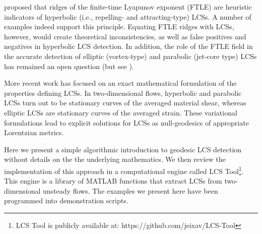 \documentclass{elsarticle}
\begin{document}
\citet{haller01:_distin} proposed that ridges of the finite-time Lyapunov exponent (FTLE) are heuristic indicators of hyperbolic (i.e., repelling- and attracting-type) LCSs. A number of examples indeed support this principle\citep{peacock13:_lagran}. Equating FTLE ridges with LCSs, however, would create theoretical inconsistencies, as well as false positives and negatives in hyperbolic LCS detection\citep{haller11:_lagran_coher_struc,norgard12:_secon_lagran_coher_struc}. In addition, the role of the FTLE field in the accurate detection of elliptic (vortex-type) and parabolic (jet-core type) LCSs has remained an open question (but see \citet{beron-vera10:_invar_lagran}).

More recent work has focused on an exact mathematical formulation of the properties defining LCSs\citep{haller11:_lagran_coher_struc,farazmand12:_comput_lagran,haller12:_geodes_theor_trans_barrier_two_dimen_flows,haller13:_coher_lagran,blazevski14:_hyper_ellip_trans_barrier_three}. In two-dimensional flows, hyperbolic and parabolic LCSs turn out to be stationary curves of the averaged material shear\citep{farazmand14:_shearless}, whereas elliptic LCSs are stationary curves of the averaged
strain\citep{haller13:_coher_lagran}. These variational formulations lead to explicit solutions for LCSs as null-geodesics of appropriate Lorentzian metrics.

Here we present a simple algorithmic introduction to geodesic LCS detection without details on the the underlying mathematics.
We then review the implementation of this approach in a computational engine called LCS Tool\footnote{LCS Tool is publicly available at: https://github.com/jeixav/LCS-Tool}.
This engine is a library of MATLAB functions that extract LCSs from two-dimensional unsteady flows. The examples we present here have been programmed into demonstration scripts.
\end{document}
